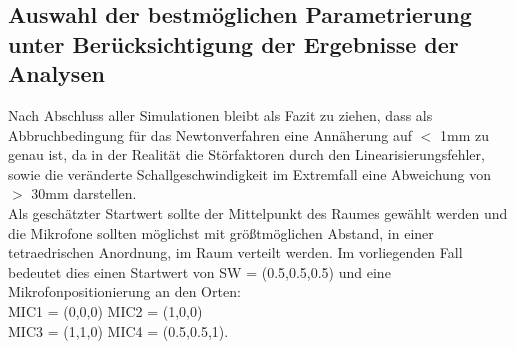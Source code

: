 \subsection{Auswahl der bestmöglichen Parametrierung unter Berücksichtigung der Ergebnisse der Analysen}
Nach Abschluss aller Simulationen bleibt als Fazit zu ziehen, dass als Abbruchbedingung für das Newtonverfahren eine Annäherung auf $<$ 1mm zu genau ist, da in der Realität die Störfaktoren durch den Linearisierungsfehler, sowie die veränderte Schallgeschwindigkeit im Extremfall eine Abweichung von $>$ 30mm darstellen.\\
Als geschätzter Startwert sollte der Mittelpunkt des Raumes gewählt werden und die Mikrofone sollten möglichst mit größtmöglichen Abstand, in einer tetraedrischen Anordnung, im Raum verteilt werden. Im vorliegenden Fall bedeutet dies einen Startwert von SW = (0.5,0.5,0.5) und eine Mikrofonpositionierung an den Orten: \\
MIC1 = (0,0,0)
MIC2 = (1,0,0)\\
MIC3 = (1,1,0)
MIC4 = (0.5,0.5,1).